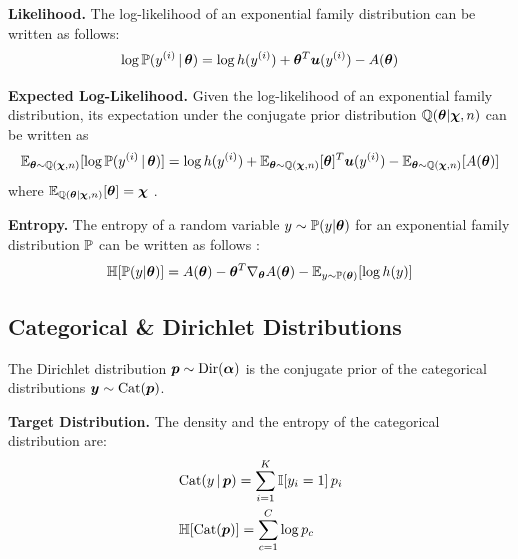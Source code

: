 \textbf{Likelihood.} The log-likelihood of an exponential family distribution can be written as follows:
%
\begin{equation}\label{eq:log-likelihood}
    \log{\mathbb{P}(y^{(i)}\ensuremath{\,|\,}\bm{\bm{\theta}})} = \log{h(y^{(i)})} + \bm{\theta}^T \bm{u}(y^{(i)}) - A(\bm{\theta})
\end{equation}

\textbf{Expected Log-Likelihood.} Given the log-likelihood of an exponential family distribution, its expectation under the conjugate prior distribution $\operatorname{\mathbb{Q}}(\bm{\theta}|\bm{\chi}, n)$ can be written as
%
\begin{equation}\label{eq:expected-log-likelihood}
    \operatorname{\mathbb{E}}_{\bm{\theta} \sim \operatorname{\mathbb{Q}}(\bm{\chi}, n)}[\log{\mathbb{P}(y^{(i)}\ensuremath{\,|\,}\bm{\bm{\theta}})}] = \log{h(y^{(i)})} + \operatorname{\mathbb{E}}_{\bm{\theta} \sim \operatorname{\mathbb{Q}}(\bm{\chi}, n)}[\bm{\theta}]^T \bm{u}(y^{(i)}) - \operatorname{\mathbb{E}}_{\bm{\theta} \sim \operatorname{\mathbb{Q}}(\bm{\chi}, n)}[A(\bm{\theta})]
\end{equation}
%
where $\operatorname{\mathbb{E}}_{\operatorname{\mathbb{Q}}(\bm{\theta}|\bm{\chi}, n)}[\bm{\theta}] = \bm{\chi}$ \citep{exponential-family-stats, conjugate-prior-exponential-family}.

\textbf{Entropy.} The entropy of a random variable $y \sim \mathbb{P}(y | \bm{\theta})$ for an exponential family distribution $\mathbb{P}$ can be written as follows \citep{exponential-entropy}:
%
\begin{equation}
    \operatorname{\mathbb{H}}[\mathbb{P}(y | \bm{\theta})] = A(\bm{\theta}) - \bm{\theta}^T \nabla_{\bm{\theta}}A(\bm{\theta}) - \operatorname{\mathbb{E}}_{y \sim \mathbb{P}(\bm{\theta})}[\log{h(y)}]
\end{equation}


\subsection{Categorical \& Dirichlet Distributions}

The Dirichlet distribution $\bm{p} \sim \operatorname{Dir}(\bm{\alpha})$ is the conjugate prior of the categorical distributions $\bm{y} \sim \operatorname{Cat}(\bm{p})$.

\textbf{Target Distribution.} The density and the entropy of the categorical distribution are:
%
\begin{align}\label{eq:density-entropy-categorical}
    &\operatorname{Cat}(y \,|\, \bm{p}) = \sum_{i=1}^K{\mathbb{I}[y_i = 1] \, p_i} \\
    &\operatorname{\mathbb{H}}[\operatorname{Cat}(\bm{p})] = \sum_{c=1}^C{\log{p_c}}
\end{align}

